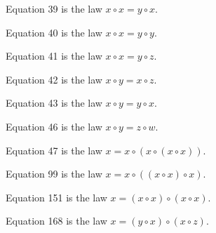 \begin{definition}[Equation 39]\label{eq39}\leanok{}  Equation 39 is the law $x \circ x = y \circ x$.
\end{definition}

\begin{definition}[Equation 40]\label{eq40}\leanok{}  Equation 40 is the law $x \circ x = y \circ y$.
\end{definition}

\begin{definition}[Equation 41]\label{eq41}\leanok{}  Equation 41 is the law $x \circ x = y \circ z$.
\end{definition}

\begin{definition}[Equation 42]\label{eq42}\leanok{}  Equation 42 is the law $x \circ y = x \circ z$.
\end{definition}

\begin{definition}[Equation 43]\label{eq43}\leanok{}  Equation 43 is the law $x \circ y = y \circ x$.
\end{definition}

\begin{definition}[Equation 46]\label{eq46}\leanok{}  Equation 46 is the law $x \circ y = z \circ w$.
\end{definition}

\begin{definition}[Equation 47]\label{eq47}\leanok{}  Equation 47 is the law $x = x \circ (x \circ (x \circ x))$.
\end{definition}

\begin{definition}[Equation 99]\label{eq99}\leanok{}  Equation 99 is the law $x = x \circ ((x \circ x) \circ x)$.
\end{definition}

\begin{definition}[Equation 151]\label{eq151}\leanok{}  Equation 151 is the law $x = (x \circ x) \circ (x \circ x)$.
\end{definition}

\begin{definition}[Equation 168]\label{eq168}\leanok{}  Equation 168 is the law $x = (y \circ x) \circ (x \circ z)$.
\end{definition}

